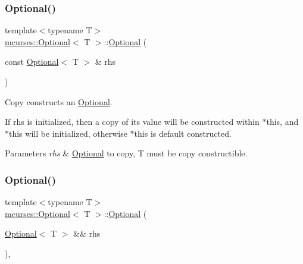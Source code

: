 \subsubsection{\texorpdfstring{Optional()}{Optional()}\hspace{0.1cm}{\footnotesize\ttfamily [7/10]}}
{\footnotesize\ttfamily template$<$typename T$>$ \\
\hyperlink{classmcurses_1_1Optional}{mcurses\+::\+Optional}$<$ T $>$\+::\hyperlink{classmcurses_1_1Optional}{Optional} (\begin{DoxyParamCaption}\item[{const \hyperlink{classmcurses_1_1Optional}{Optional}$<$ T $>$ \&}]{rhs }\end{DoxyParamCaption})\hspace{0.3cm}{\ttfamily [inline]}}



Copy constructs an \hyperlink{classmcurses_1_1Optional}{Optional}. 

If {\ttfamily rhs} is initialized, then a copy of its value will be constructed within $\ast$this, and $\ast$this will be initialized, otherwise $\ast$this is default constructed. 
\begin{DoxyParams}{Parameters}
{\em rhs} & \hyperlink{classmcurses_1_1Optional}{Optional} to copy, T must be copy constructible. \\
\hline
\end{DoxyParams}
\hypertarget{classmcurses_1_1Optional_a4f9963abeb921ad1b51bbb176fe1e8fd}{}\label{classmcurses_1_1Optional_a4f9963abeb921ad1b51bbb176fe1e8fd} 
\subsubsection{\texorpdfstring{Optional()}{Optional()}\hspace{0.1cm}{\footnotesize\ttfamily [8/10]}}
{\footnotesize\ttfamily template$<$typename T$>$ \\
\hyperlink{classmcurses_1_1Optional}{mcurses\+::\+Optional}$<$ T $>$\+::\hyperlink{classmcurses_1_1Optional}{Optional} (\begin{DoxyParamCaption}\item[{\hyperlink{classmcurses_1_1Optional}{Optional}$<$ T $>$ \&\&}]{rhs }\end{DoxyParamCaption})\hspace{0.3cm}{\ttfamily [inline]}, {\ttfamily [noexcept]}}



